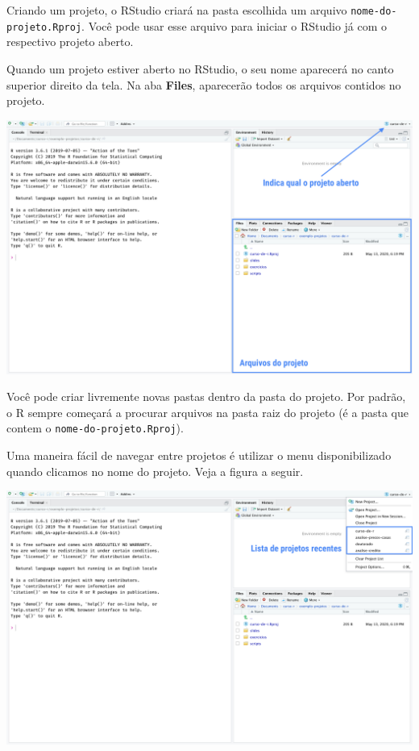 \documentclass[]{book}
\begin{document}
Criando um projeto, o RStudio criará na pasta escolhida um arquivo \texttt{nome-do-projeto.Rproj}. Você pode usar esse arquivo para iniciar o RStudio já com o respectivo projeto aberto.

Quando um projeto estiver aberto no RStudio, o seu nome aparecerá no canto superior direito da tela. Na aba \textbf{Files}, aparecerão todos os arquivos contidos no projeto.

\begin{center}\includegraphics[width=40in]{img/rstudio/exemplo-projeto-aberto} \end{center}

Você pode criar livremente novas pastas dentro da pasta do projeto. Por padrão, o R sempre começará a procurar arquivos na pasta raiz do projeto (é a pasta que contem o \texttt{nome-do-projeto.Rproj}).

Uma maneira fácil de navegar entre projetos é utilizar o menu disponibilizado quando clicamos no nome do projeto. Veja a figura a seguir.

\begin{center}\includegraphics[width=40in]{img/rstudio/exemplo-lista-projetos} \end{center}
\end{document}
